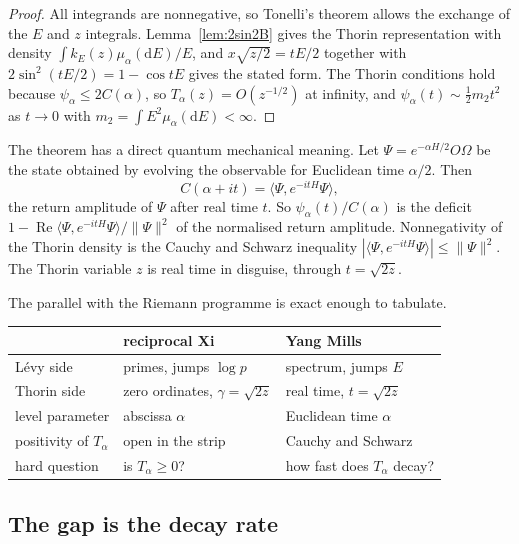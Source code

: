 \begin{proof}
All integrands are nonnegative, so Tonelli's theorem allows the exchange of the $E$ and $z$ integrals. Lemma~\ref{lem:2sin2B} gives the Thorin representation with density $\int k_E(z)\mu_\alpha(\mathrm dE)/E$, and $x\sqrt{z/2}=tE/2$ together with $2\sin^2(tE/2)=1-\cos tE$ gives the stated form. The Thorin conditions hold because $\psi_\alpha\le2C(\alpha)$, so $T_\alpha(z)=O(z^{-1/2})$ at infinity, and $\psi_\alpha(t)\sim\frac12m_2t^2$ as $t\to0$ with $m_2=\int E^2\mu_\alpha(\mathrm dE)<\infty$.
\end{proof}

The theorem has a direct quantum mechanical meaning. Let $\Psi=e^{-\alpha H/2}O\Omega$ be the state obtained by evolving the observable for Euclidean time $\alpha/2$. Then
\[
C(\alpha+it)=\langle\Psi,e^{-itH}\Psi\rangle,
\]
the return amplitude of $\Psi$ after real time $t$. So $\psi_\alpha(t)/C(\alpha)$ is the deficit $1-\operatorname{Re}\langle\Psi,e^{-itH}\Psi\rangle/\|\Psi\|^2$ of the normalised return amplitude. Nonnegativity of the Thorin density is the Cauchy and Schwarz inequality $|\langle\Psi,e^{-itH}\Psi\rangle|\le\|\Psi\|^2$. The Thorin variable $z$ is real time in disguise, through $t=\sqrt{2z}$.

The parallel with the Riemann programme is exact enough to tabulate.
\begin{center}
\small
\begin{tabular}{lll}
\toprule
 & reciprocal Xi & Yang Mills \\ \midrule
L\'evy side & primes, jumps $\log p$ & spectrum, jumps $E$ \\
Thorin side & zero ordinates, $\gamma=\sqrt{2z}$ & real time, $t=\sqrt{2z}$ \\
level parameter & abscissa $\alpha$ & Euclidean time $\alpha$ \\
positivity of $T_\alpha$ & open in the strip & Cauchy and Schwarz \\
hard question & is $T_\alpha\ge0$? & how fast does $T_\alpha$ decay? \\
\bottomrule
\end{tabular}
\end{center}

\subsection{The gap is the decay rate}

